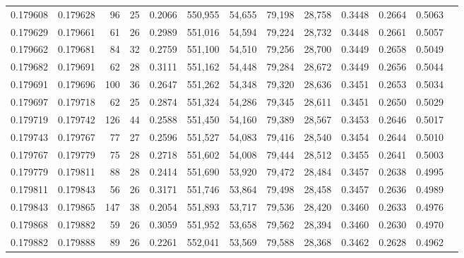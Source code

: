 \begin{tabular}{rrrrrrrrrrrrr}
0.179608 & 0.179628 &  96 &  25 &                                     0.2066 & 550,955 &  54,655 &  79,198 &  28,758 & 0.3448 & 0.2664 & 0.5063 \\
0.179629 & 0.179661 &  61 &  26 &                                     0.2989 & 551,016 &  54,594 &  79,224 &  28,732 & 0.3448 & 0.2661 & 0.5057 \\
0.179662 & 0.179681 &  84 &  32 &                                     0.2759 & 551,100 &  54,510 &  79,256 &  28,700 & 0.3449 & 0.2658 & 0.5049 \\
0.179682 & 0.179691 &  62 &  28 &                                     0.3111 & 551,162 &  54,448 &  79,284 &  28,672 & 0.3449 & 0.2656 & 0.5044 \\
0.179691 & 0.179696 & 100 &  36 &                                     0.2647 & 551,262 &  54,348 &  79,320 &  28,636 & 0.3451 & 0.2653 & 0.5034 \\
0.179697 & 0.179718 &  62 &  25 &                                     0.2874 & 551,324 &  54,286 &  79,345 &  28,611 & 0.3451 & 0.2650 & 0.5029 \\
0.179719 & 0.179742 & 126 &  44 &                                     0.2588 & 551,450 &  54,160 &  79,389 &  28,567 & 0.3453 & 0.2646 & 0.5017 \\
0.179743 & 0.179767 &  77 &  27 &                                     0.2596 & 551,527 &  54,083 &  79,416 &  28,540 & 0.3454 & 0.2644 & 0.5010 \\
0.179767 & 0.179779 &  75 &  28 &                                     0.2718 & 551,602 &  54,008 &  79,444 &  28,512 & 0.3455 & 0.2641 & 0.5003 \\
0.179779 & 0.179811 &  88 &  28 &                                     0.2414 & 551,690 &  53,920 &  79,472 &  28,484 & 0.3457 & 0.2638 & 0.4995 \\
0.179811 & 0.179843 &  56 &  26 &                                     0.3171 & 551,746 &  53,864 &  79,498 &  28,458 & 0.3457 & 0.2636 & 0.4989 \\
0.179843 & 0.179865 & 147 &  38 &                                     0.2054 & 551,893 &  53,717 &  79,536 &  28,420 & 0.3460 & 0.2633 & 0.4976 \\
0.179868 & 0.179882 &  59 &  26 &                                     0.3059 & 551,952 &  53,658 &  79,562 &  28,394 & 0.3460 & 0.2630 & 0.4970 \\
0.179882 & 0.179888 &  89 &  26 &                                     0.2261 & 552,041 &  53,569 &  79,588 &  28,368 & 0.3462 & 0.2628 & 0.4962 \\

\end{tabular}
